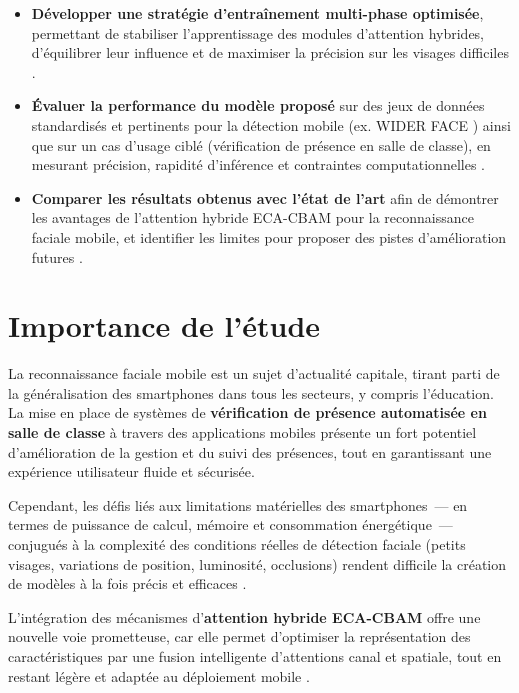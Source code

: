 \begin{onehalfspace}
\begin{itemize}
\item \textbf{Développer une stratégie d'entraînement multi-phase optimisée}, permettant de stabiliser l'apprentissage des modules d'attention hybrides, d'équilibrer leur influence et de maximiser la précision sur les visages difficiles \cite{Wang2024ECACBAM}.

\item \textbf{Évaluer la performance du modèle proposé} sur des jeux de données standardisés et pertinents pour la détection mobile (ex. WIDER FACE \cite{Yang2016WIDERFACE}) ainsi que sur un cas d'usage ciblé (vérification de présence en salle de classe), en mesurant précision, rapidité d'inférence et contraintes computationnelles \cite{Zhang2019BlazeFace, Kim2025FeatherFace}.

\item \textbf{Comparer les résultats obtenus avec l'état de l'art} afin de démontrer les avantages de l'attention hybride ECA-CBAM pour la reconnaissance faciale mobile, et identifier les limites pour proposer des pistes d'amélioration futures \cite{Woo2018CBAM, Wang2020ECANet}.
\end{itemize}

\section{Importance de l'étude}

\hspace{0.65 cm}La reconnaissance faciale mobile est un sujet d'actualité capitale, tirant parti de la généralisation des smartphones dans tous les secteurs, y compris l'éducation. La mise en place de systèmes de \textbf{vérification de présence automatisée en salle de classe} à travers des applications mobiles présente un fort potentiel d'amélioration de la gestion et du suivi des présences, tout en garantissant une expérience utilisateur fluide et sécurisée.

\hspace{0.65 cm}Cependant, les défis liés aux limitations matérielles des smartphones~— en termes de puissance de calcul, mémoire et consommation énergétique~— conjugués à la complexité des conditions réelles de détection faciale (petits visages, variations de position, luminosité, occlusions) rendent difficile la création de modèles à la fois précis et efficaces \cite{Zhang2019BlazeFace}.

\hspace{0.65 cm}L'intégration des mécanismes d'\textbf{attention hybride ECA-CBAM} offre une nouvelle voie prometteuse, car elle permet d'optimiser la représentation des caractéristiques par une fusion intelligente d'attentions canal et spatiale, tout en restant légère et adaptée au déploiement mobile \cite{Wang2020ECANet, Woo2018CBAM, Kim2025FeatherFace}.


\end{onehalfspace}
